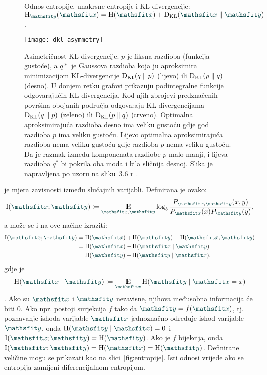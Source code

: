 \documentclass[utf8, diplomski, lmodern]{fer}
\begin{document}
\begin{figure}
	\centering
	\caption{Odnos entropije, unakrsne entropije i KL-divergencije: $\H_{\rvar y}(\rvar x)=\H(\rvar x)+\Dkl{\rvar x}{\rvar y}$.}
	\label{fig:dkl}
\end{figure}

\begin{figure}
	\centering
	\texttt{[image: dkl-asymmetry]}
	\caption{Asimetričnost KL-divergencije. $p$ je fiksna razdioba (funkcija gustoće), a $q*$ je Gaussova razdioba koja ju aproksimira minimizacijom KL-divergencije $\Dkl{q}{p}$ (lijevo) ili $\Dkl{p}{q}$ (desno). U donjem retku grafovi prikazuju podintegralne funkcije odgovarajućih KL-divergencija. Kod njih zbrojevi predznačenih površina obojanih područja odgovaraju KL-divergencijama $\Dkl{q}{p}$ (zeleno) ili $\Dkl{p}{q}$ (crveno). Optimalna aproksimirajuća razdioba desno ima veliku gustoću gdje god razdioba $p$ ima veliku gustoću. Lijevo optimalna aproksimirajuća razdioba nema veliku gustoću gdje razdioba $p$ nema veliku gustoću. Da je razmak između komponenata razdiobe $p$ malo manji, i lijeva razdioba $q^*$ bi pokrila oba moda i bila sličnija desnoj. Slika je napravljena po uzoru na sliku~3.6 u \citet{Goodfellow:2016:DL}.}
	\label{fig:dkl-asymmetry}
\end{figure}

 je mjera zavisnosti između slučajnih varijabli. Definirana je ovako:
\begin{align} \label{eq:mutinf}
\I\del{\rvar x;\rvar y} \coloneqq \E_{\rvar x, \rvar y} \log_b\frac{P_{\rvar x, \rvar y}(x, y)}{P_{\rvar x}(x)P_{\rvar y}(y)} \text{,}
\end{align}
a može se i na ove načine izraziti:
\begin{align}
\I(\rvar x;\rvar y)
&= \H(\rvar x)+\H(\rvar y)-\H(\rvar x, \rvar y) \\
&= \H(\rvar x)-\H(\rvar x\mid \rvar y) \\
&= \H(\rvar y)-\H(\rvar y\mid\rvar x) \text{,} 
\label{eq:mutinf-zadnja}
\end{align}
gdje je
\begin{align}
\H(\rvar x\mid \rvar y) \coloneqq \E_{\rvar x} \H(\rvar y\mid \rvar x=x)
\label{eq:condentropy}
\end{align}
. Ako su $\rvar x$ i $\rvar y$ nezavisne, njihova međusobna informacija će biti $0$. Ako npr. postoji surjekcija $f$ tako da $\rvar y=f(\rvar x)$, tj. poznavanje ishoda varijable $\rvar x$ jednoznačno određuje ishod varijable $\rvar y$, onda $\H(\rvar y\mid\rvar x)=0$ i $\I(\rvar x;\rvar y) = \H(\rvar y)$. Ako je $f$ bijekcija, onda $\I(\rvar x;\rvar y) = \H(\rvar x) = \H(\rvar y)$. Definirane veličine mogu se prikazati kao na slici~\ref{fig:entropije}. Isti odnosi vrijede ako se entropija zamijeni diferencijalnom entropijom.
\end{document}
